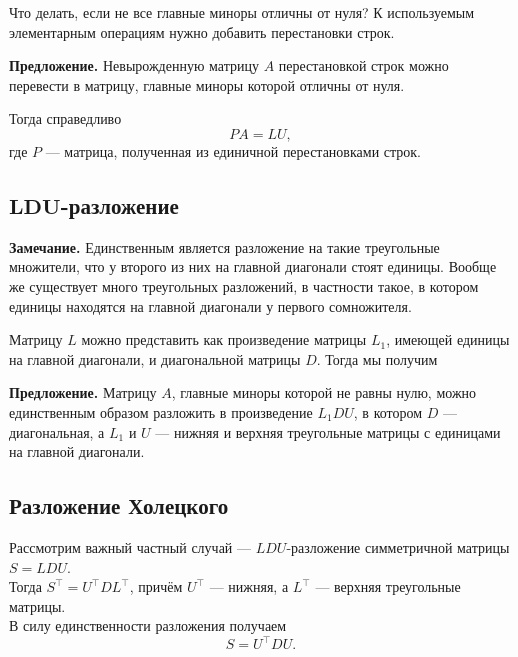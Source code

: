 \documentclass[11pt,a4paper]{article}
\begin{document}
Что делать, если не все главные миноры отличны от нуля? К используемым
элементарным операциям нужно добавить перестановки строк.

\textbf{Предложение.} Невырожденную матрицу \(A\) перестановкой строк
можно перевести в матрицу, главные миноры которой отличны от нуля.

Тогда справедливо \[ PA = LU,\] где \(P\) --- матрица, полученная из
единичной перестановками строк.

    \hypertarget{mathbfldu-ux440ux430ux437ux43bux43eux436ux435ux43dux438ux435}{%
\subsection{\texorpdfstring{\(\mathbf{LDU}\)-разложение}{\textbackslash{}mathbf\{LDU\}-разложение}}\label{mathbfldu-ux440ux430ux437ux43bux43eux436ux435ux43dux438ux435}}

\textbf{Замечание.} Единственным является разложение на такие
треугольные множители, что у второго из них на главной диагонали стоят
единицы. Вообще же существует много треугольных разложений, в частности
такое, в котором единицы находятся на главной диагонали у первого
сомножителя.

Матрицу \(L\) можно представить как произведение матрицы \(L_1\),
имеющей единицы на главной диагонали, и диагональной матрицы \(D\).
Тогда мы получим

\textbf{Предложение.} Матрицу \(A\), главные миноры которой не равны
нулю, можно единственным образом разложить в произведение \(L_1 D U\), в
котором \(D\) --- диагональная, а \(L_1\) и \(U\) --- нижняя и верхняя
треугольные матрицы с единицами на главной диагонали.

    \hypertarget{ux440ux430ux437ux43bux43eux436ux435ux43dux438ux435-ux445ux43eux43bux435ux446ux43aux43eux433ux43e}{%
\subsection{Разложение
Холецкого}\label{ux440ux430ux437ux43bux43eux436ux435ux43dux438ux435-ux445ux43eux43bux435ux446ux43aux43eux433ux43e}}

Рассмотрим важный частный случай --- \(LDU\)-разложение симметричной
матрицы \(S = LDU\).\\
Тогда \(S^\top = U^\top D L^\top\), причём \(U^\top\) --- нижняя, а
\(L^\top\) --- верхняя треугольные матрицы.\\
В силу единственности разложения получаем \[ S = U^\top D U. \]
\end{document}
